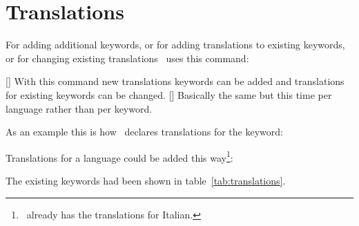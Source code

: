 \documentclass{acro-manual}
\begin{document}
\section{Translations}\label{sec:translations}
For adding additional keywords, or for adding translations to existing
keywords, or for changing existing translations \acro\ uses this command:
\begin{commands}
  []
    With this command new translations keywords can be added and translations
    for existing keywords can be changed.
  []
    Basically the same but this time per language rather than per keyword.
\end{commands}
As an example this is how \acro\ declares translations for the 
keyword:
\begin{sourcecode}
\end{sourcecode}
Translations for a language could be added this way\footnote{\acro\ already
  has the translations for Italian.}:
\begin{sourcecode}
\end{sourcecode}
The existing keywords had been shown in table~\vref{tab:translations}.
\end{document}
